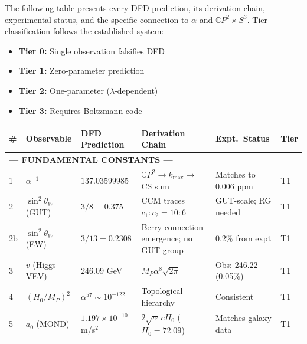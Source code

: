 \documentclass[12pt,a4paper]{article}
\newcommand{\CP}{\mathbb{C}P}
\begin{document}
The following table presents every DFD prediction, its derivation chain,
experimental status, and the specific connection to $\alpha$ and $\CP^2
\times S^3$.  Tier classification follows the established system:

\begin{itemize}[nosep]
\item \textcolor{tier0}{\textbf{Tier 0:}} Single observation falsifies DFD
\item \textcolor{tier1}{\textbf{Tier 1:}} Zero-parameter prediction
\item \textcolor{tier2}{\textbf{Tier 2:}} One-parameter ($\lambda$-dependent)
\item \textcolor{tier3}{\textbf{Tier 3:}} Requires Boltzmann code
\end{itemize}

{\small
\begin{longtable}{p{0.4cm}p{2.3cm}p{2.8cm}p{2.4cm}p{2.2cm}p{1.5cm}}
\toprule
\# & \textbf{Observable} & \textbf{DFD Prediction} &
  \textbf{Derivation Chain} & \textbf{Expt.\ Status} & \textbf{Tier} \\
\midrule
\endhead

\multicolumn{6}{l}{\textbf{\textcolor{derived}{--- FUNDAMENTAL CONSTANTS ---}}} \\
\midrule

1 & $\alpha^{-1}$ & $137.03599985$ &
  $\CP^2 \to k_{\max} \to$ CS sum &
  Matches to 0.006 ppm &
  \textcolor{tier1}{T1} \\[3pt]

2 & $\sin^2\theta_W$ (GUT) & $3/8 = 0.375$ &
  CCM traces $c_1:c_2 = 10:6$ &
  GUT-scale; RG needed &
  \textcolor{tier1}{T1} \\[3pt]

2b & $\sin^2\theta_W$ (EW) & $3/13 = 0.2308$ &
  Berry-connection emergence; no GUT group &
  $0.2\%$ from expt &
  \textcolor{tier1}{T1} \\[3pt]

3 & $v$ (Higgs VEV) & $246.09$ GeV &
  $M_P\alpha^8\sqrt{2\pi}$ &
  Obs: 246.22 (0.05\%) &
  \textcolor{tier1}{T1} \\[3pt]

4 & $(H_0/M_P)^2$ & $\alpha^{57} \sim 10^{-122}$ &
  Topological hierarchy &
  Consistent &
  \textcolor{tier1}{T1} \\[3pt]

5 & $a_0$ (MOND) & $1.197 \times 10^{-10}$ m/s$^2$ &
  $2\sqrt{\alpha}\,cH_0$ ($H_0 = 72.09$) &
  Matches galaxy data &
  \textcolor{tier1}{T1} \\[3pt]


\end{longtable}}
\end{document}
